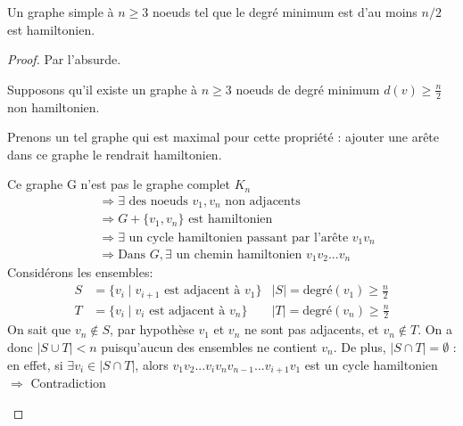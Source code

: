 \begin{mytheo} 
  Un graphe simple à $n \geq 3$ noeuds tel que le degré minimum est d’au moins $n/2$ est hamiltonien.
  \begin{proof}
     Par l'absurde. 
     
     Supposons qu'il existe un graphe à $n \geq 3$ noeuds de degré minimum $d(v) \geq \frac{n}{2}$ non hamiltonien.
     
     Prenons un tel graphe qui est maximal pour cette propriété : ajouter une arête dans ce graphe le rendrait hamiltonien.
     
     Ce graphe G n'est pas le graphe complet $K_n$
     \begin{align*}
		&\Rightarrow \exists \text{ des noeuds } v_1, v_n \text{ non adjacents} \\
		&\Rightarrow G + \{v_1, v_n \} \text{ est hamiltonien} \\
		&\Rightarrow \exists \text{ un cycle hamiltonien passant par l'arête } v_1v_n \\
		&\Rightarrow \text{Dans } G, \exists \text{ un chemin hamiltonien } v_1v_2...v_n
	\end{align*}
	Considérons les ensembles:
	\begin{align*}
		S &= \{v_i \mid v_{i+1} \text{ est adjacent à } v_1\} &\vert S \vert = \text{degré}(v_1) \geq \frac{n}{2}\\
		T &= \{v_i \mid v_{i} \text{ est adjacent à } v_n\} &\vert T \vert = \text{degré}(v_n) \geq \frac{n}{2}
	\end{align*}
	On sait que $v_n \not\in S$, par hypothèse $v_1$ et $v_n$ ne sont pas adjacents, et $v_n \not\in T$. On a donc $\vert S \cup T \vert < n$ puisqu'aucun des ensembles ne contient $v_n$.
	De plus, $\vert S \cap T \vert = \emptyset $ : en effet, si $\exists v_i \in \vert S \cap T \vert$, alors $v_1v_2...v_iv_nv_{n-1}...v_{i+1}v_1$ est un cycle hamiltonien $\Rightarrow$ Contradiction
	\begin{figure} [!h]
		\center
\end{figure}
\end{proof}
\end{mytheo}
